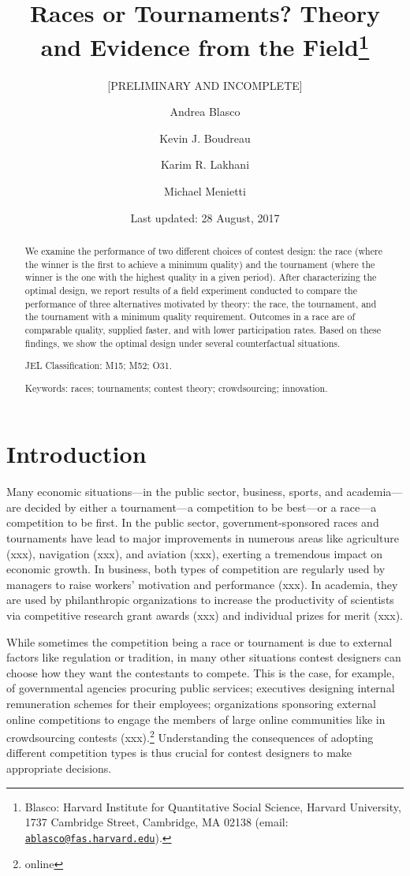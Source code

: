 \documentclass[10pt, titlepage]{article}
\title{Races or Tournaments? Theory and Evidence from the Field\thanks{Blasco: Harvard Institute for Quantitative Social Science, Harvard
University, 1737 Cambridge Street, Cambridge, MA 02138 (email:
\href{mailto:ablasco@fas.harvard.edu}{\nolinkurl{ablasco@fas.harvard.edu}}).}}
\subtitle{{[}PRELIMINARY AND INCOMPLETE{]}}
\author{Andrea Blasco \and Kevin J. Boudreau \and Karim R. Lakhani \and Michael Menietti}
\date{Last updated: 28 August, 2017}
\begin{document}
\maketitle
\begin{abstract}
We examine the performance of two different choices of contest design:
the race (where the winner is the first to achieve a minimum quality)
and the tournament (where the winner is the one with the highest quality
in a given period). After characterizing the optimal design, we report
results of a field experiment conducted to compare the performance of
three alternatives motivated by theory: the race, the tournament, and
the tournament with a minimum quality requirement. Outcomes in a race
are of comparable quality, supplied faster, and with lower participation
rates. Based on these findings, we show the optimal design under several
counterfactual situations.

\smallskip\noindent 
JEL Classification: M15; M52; O31.

\smallskip\noindent 
Keywords: races; tournaments; contest theory; crowdsourcing; innovation.
\end{abstract}


\clearpage
\tableofcontents
\setcounter{tocdepth}{2}
\clearpage

\section{Introduction}\label{introduction}

Many economic situations---in the public sector, business, sports, and
academia---are decided by either a tournament---a competition to be
best---or a race---a competition to be first. In the public sector,
government-sponsored races and tournaments have lead to major
improvements in numerous areas like agriculture (xxx), navigation (xxx),
and aviation (xxx), exerting a tremendous impact on economic growth. In
business, both types of competition are regularly used by managers to
raise workers' motivation and performance (xxx). In academia, they are
used by philanthropic organizations to increase the productivity of
scientists via competitive research grant awards (xxx) and individual
prizes for merit (xxx).

While sometimes the competition being a race or tournament is due to
external factors like regulation or tradition, in many other situations
contest designers can choose how they want the contestants to compete.
This is the case, for example, of governmental agencies procuring public
services; executives designing internal remuneration schemes for their
employees; organizations sponsoring external online competitions to
engage the members of large online communities like in crowdsourcing
contests (xxx).\footnote{online} Understanding the consequences of
adopting different competition types is thus crucial for contest
designers to make appropriate decisions.
\end{document}
